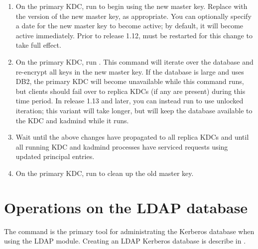 \documentclass[letterpaper,10pt,english]{sphinxmanual}
\begin{document}
\begin{enumerate}
\item {} 
On the primary KDC, run  to begin using the
new master key.  Replace  with the version of the new master
key, as appropriate.  You can optionally specify a date for the new
master key to become active; by default, it will become active
immediately.  Prior to release 1.12, {\hyperref[\detokenize{admin/admin_commands/kadmind:kadmind-8}]{}} must be
restarted for this change to take full effect.

\item {} 
On the primary KDC, run .
This command will iterate over the database and re-encrypt all keys
in the new master key.  If the database is large and uses DB2, the
primary KDC will become unavailable while this command runs, but
clients should fail over to replica KDCs (if any are present)
during this time period.  In release 1.13 and later, you can
instead run  to
use unlocked iteration; this variant will take longer, but will
keep the database available to the KDC and kadmind while it runs.

\item {} 
Wait until the above changes have propagated to all replica KDCs
and until all running KDC and kadmind processes have serviced
requests using updated principal entries.

\item {} 
On the primary KDC, run  to clean up the
old master key.

\end{enumerate}


\section{Operations on the LDAP database}
\label{\detokenize{admin/database:operations-on-the-ldap-database}}\label{\detokenize{admin/database:ops-on-ldap}}
The {\hyperref[\detokenize{admin/admin_commands/kdb5_ldap_util:kdb5-ldap-util-8}]{}} command is the primary tool for
administrating the Kerberos database when using the LDAP module.
Creating an LDAP Kerberos database is describe in {\hyperref[\detokenize{admin/conf_ldap:conf-ldap}]{}}.
\end{document}
